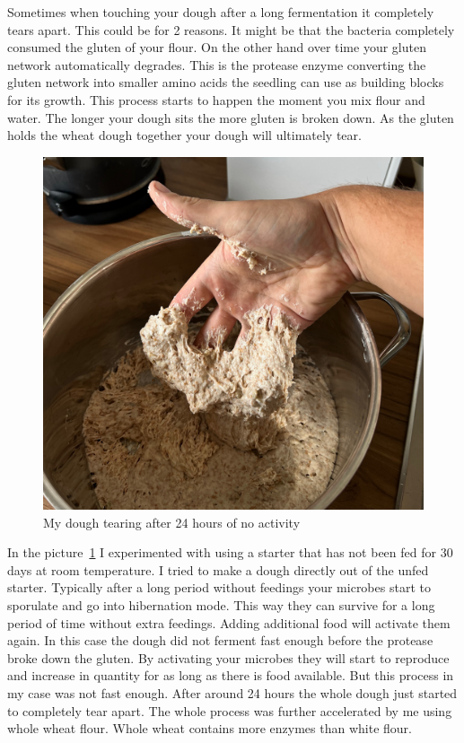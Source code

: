 Sometimes when touching your dough after a long fermentation
it completely tears apart. This could be for 2 reasons. It might
be that the bacteria completely consumed the gluten of your flour.
On the other hand over time your gluten network automatically
degrades. This is the protease enzyme converting the gluten
network into smaller amino acids the seedling can use as
building blocks for its growth. This process starts to happen
the moment you mix flour and water. The longer your dough sits
the more gluten is broken down. As the gluten holds the
wheat dough together your dough will ultimately tear.

\begin{figure}[!htb]
  \includegraphics[width=1.0\textwidth]{tearing-dough}
  \caption{My dough tearing after 24 hours of no activity}
  \label{fig:tearing-dough}
\end{figure}

In the picture~\ref{fig:tearing-dough} I experimented with
using a starter that has not been fed for 30 days at room temperature.
I tried to make a dough directly out of the unfed starter.
Typically after a long period
without feedings your microbes start to sporulate and go
into hibernation mode. This way they can survive for a long
period of time without extra feedings. Adding additional food
will activate them again. In this case the dough did not ferment
fast enough before the protease broke down the gluten. By activating
your microbes they will start to reproduce and increase in quantity
for as long as there is food available. But this process
in my case was not fast enough. After around 24 hours the whole
dough just started to completely tear apart. The whole process was further
accelerated by me using whole wheat flour. Whole wheat
contains more enzymes than white flour.

